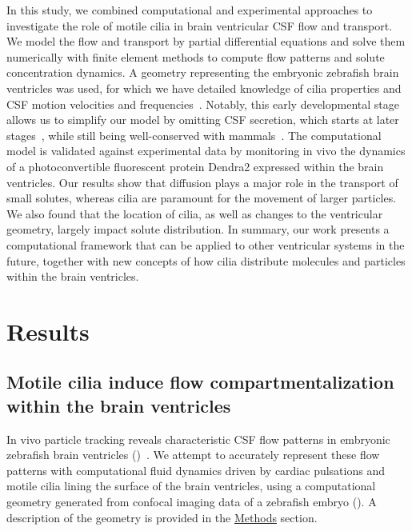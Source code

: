 \documentclass{WileyMSP-template}
\begin{document}
In this study, we combined computational and experimental approaches to investigate
the role of motile cilia in brain ventricular CSF flow and transport.
We model the flow and transport by partial differential equations and solve
them numerically with finite element methods to compute flow patterns and
solute concentration dynamics. A geometry representing the embryonic zebrafish brain ventricles
was used, for which we have detailed knowledge of cilia properties and CSF motion velocities
and frequencies~\cite{Olstad2019CiliaryDevelopment}. 
Notably, this early developmental stage allows us to simplify our model
by omitting CSF secretion, which starts at later stages~\cite{Jeong2024TheZebrafish},
while still being well-conserved with mammals~\cite{DGama2025MotileBrain,
Olstad2019CiliaryDevelopment, Ringers2020Role, DGama2021Diversity, jurisch2020radial}. 
The computational model is validated against experimental data by monitoring in vivo
the dynamics of a photoconvertible fluorescent protein Dendra2
expressed within the brain ventricles.
Our results show that diffusion plays a major role in the transport of small solutes,
whereas cilia are paramount for the movement of larger particles.
We also found that the location of cilia, as well as changes to the ventricular geometry,
largely impact solute distribution.
In summary, our work presents a computational
framework that can be applied to other
ventricular systems in the future, together with new concepts
of how cilia distribute molecules and
particles within the brain ventricles. 

\section{Results}

\subsection{Motile cilia induce flow compartmentalization within the brain ventricles}

In vivo particle tracking reveals characteristic CSF flow patterns in
embryonic zebrafish brain ventricles
()~\cite{Olstad2019CiliaryDevelopment}.
We attempt to accurately represent these flow patterns with
computational fluid dynamics driven by cardiac pulsations and motile
cilia lining the surface of the brain ventricles, using a
computational geometry generated from confocal imaging data of
a zebrafish embryo ().
A description of the geometry is provided in the
\hyperref[sec:methods]{Methods} section.
\end{document}
